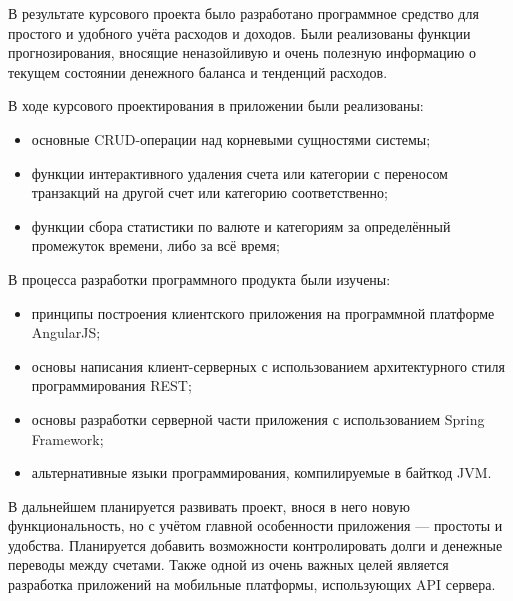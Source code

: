 
В результате курсового проекта было разработано программное средство для простого и 
удобного учёта расходов и доходов. Были реализованы функции прогнозирования, вносящие
неназойливую и очень полезную информацию о текущем состоянии денежного баланса и тенденций 
расходов.

В ходе курсового проектирования в приложении были реализованы:
\begin{itemize}
  \item основные CRUD-операции над корневыми сущностями системы;
  \item функции интерактивного удаления счета или категории с переносом транзакций на другой счет или категорию соответственно;
  \item функции сбора статистики по валюте и категориям за определённый промежуток времени, либо за всё время;
\end{itemize}

В процесса разработки программного продукта были изучены:
\begin{itemize}
	\item принципы построения клиентского приложения на программной платформе AngularJS;
	\item основы написания клиент-серверных с использованием архитектурного стиля программирования REST;
	\item основы разработки серверной части приложения с использованием Spring Framework;
	\item альтернативные языки программирования, компилируемые в байткод JVM.
\end{itemize}

В дальнейшем планируется развивать проект, внося в него новую функциональность, но с учётом
главной особенности приложения --- простоты и удобства. Планируется добавить возможности 
контролировать долги и денежные переводы между счетами. Также одной из очень важных целей является
разработка приложений на мобильные платформы, использующих API сервера. 



